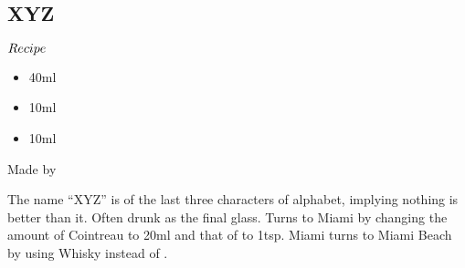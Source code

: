 \subsection{XYZ}
\begin{itembox}[l]{\boldmath $Recipe$}
\begin{itemize}
\setlength{\parskip}{0cm}
\setlength{\itemsep}{0cm}
\item \lrum 40ml
\item \cointreau 10ml
\item \lj 10ml
\end{itemize}
\vspace{-4mm}
Made by \shake
\end{itembox}
The name ``XYZ'' is of the last three characters of alphabet, implying nothing is better than it.
Often drunk as the final glass.
Turns to Miami by changing the amount of Cointreau to 20ml and that of \lj to 1tsp.
Miami turns to Miami Beach by using Whisky instead of \lrum
\hspace{-1mm}.
